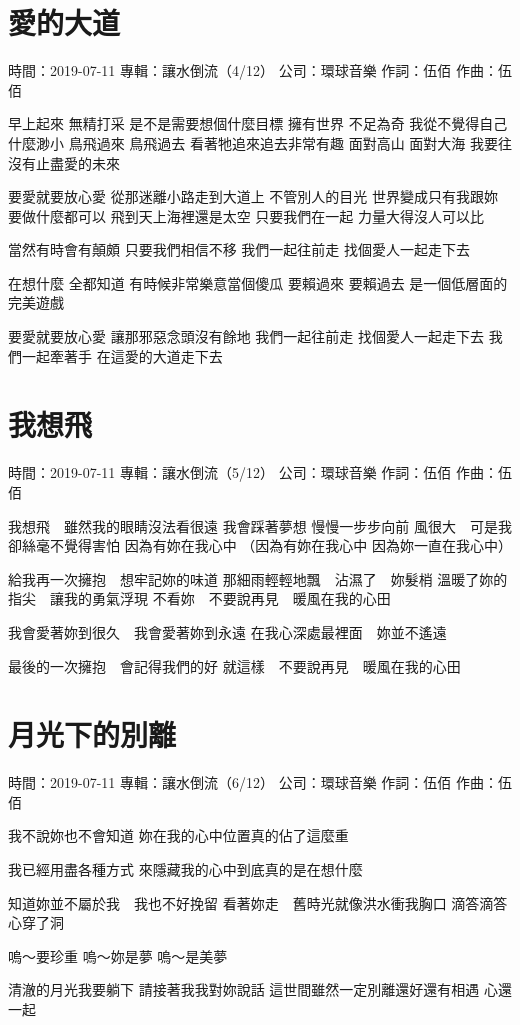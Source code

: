 \documentclass[UTF8,a4paper,oneside,twocolumn,12pt]{ctexbook}
\newcommand{\infopair}[2]{\textbullet #1：#2}
\newcommand{\zc}[1][伍佰]{\infopair{作詞}{#1}}
\newcommand{\zq}[1][伍佰]{\infopair{作曲}{#1}}
\newcommand{\zj}[1]{\infopair{專輯}{#1}}
\newcommand{\sj}[1]{\infopair{時間}{#1}}
\newcommand{\gs}[1]{\infopair{公司}{#1}}
\newenvironment{info}{\begin{flushleft}\kaishu
	}
	{\end{flushleft}\normalsize\yahei\par}
\newenvironment{lyric}{
	}
{}
\begin{document}
\section{愛的大道}
\begin{info}
	\sj{2019-07-11}
	\zj{讓水倒流（4/12）}
	\gs{環球音樂}
	\zc
	\zq
\end{info}
\begin{lyric}
	早上起來 無精打采
	是不是需要想個什麼目標
	擁有世界 不足為奇
	我從不覺得自己什麼渺小
	鳥飛過來 鳥飛過去
	看著牠追來追去非常有趣
	面對高山 面對大海
	我要往沒有止盡愛的未來

	要愛就要放心愛
	從那迷離小路走到大道上
	不管別人的目光
	世界變成只有我跟妳
	要做什麼都可以
	飛到天上海裡還是太空
	只要我們在一起
	力量大得沒人可以比

	當然有時會有顛頗
	只要我們相信不移
	我們一起往前走
	找個愛人一起走下去

	在想什麼 全都知道
	有時候非常樂意當個傻瓜
	要賴過來 要賴過去
	是一個低層面的完美遊戲

	要愛就要放心愛
	讓那邪惡念頭沒有餘地
	我們一起往前走
	找個愛人一起走下去
	我們一起牽著手
	在這愛的大道走下去
\end{lyric}

\section{我想飛}
\begin{info}
	\sj{2019-07-11}
	\zj{讓水倒流（5/12）}
	\gs{環球音樂}
	\zc
	\zq
\end{info}
\begin{lyric}
	我想飛　雖然我的眼睛沒法看很遠
	我會踩著夢想
	慢慢一步步向前
	風很大　可是我卻絲毫不覺得害怕
	因為有妳在我心中
	（因為有妳在我心中 因為妳一直在我心中）

	給我再一次擁抱　想牢記妳的味道
	那細雨輕輕地飄　沾濕了　妳髮梢
	溫暖了妳的指尖　讓我的勇氣浮現
	不看妳　不要說再見　暖風在我的心田

	我會愛著妳到很久　我會愛著妳到永遠
	在我心深處最裡面　妳並不遙遠

	最後的一次擁抱　會記得我們的好
	就這樣　不要說再見　暖風在我的心田
\end{lyric}

\section{月光下的別離}
\begin{info}
	\sj{2019-07-11}
	\zj{讓水倒流（6/12）}
	\gs{環球音樂}
	\zc
	\zq
\end{info}
\begin{lyric}
	我不說妳也不會知道
	妳在我的心中位置真的佔了這麼重

	我已經用盡各種方式
	來隱藏我的心中到底真的是在想什麼

	知道妳並不屬於我　我也不好挽留
	看著妳走　舊時光就像洪水衝我胸口
	滴答滴答心穿了洞

	嗚～要珍重
	嗚～妳是夢
	嗚～是美夢

	清澈的月光我要躺下
	請接著我我對妳說話
	這世間雖然一定別離還好還有相遇
	心還一起
\end{lyric}
\end{document}

